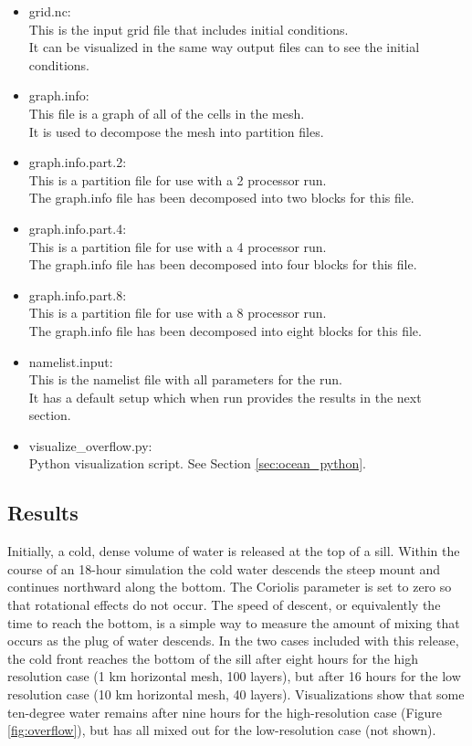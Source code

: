 \begin{itemize}
	\item grid.nc: \\
		This is the input grid file that includes initial conditions.  \\
		It can be visualized in the same way output files can to see the initial conditions.
	\item graph.info: \\
		This file is a graph of all of the cells in the mesh. \\
		It is used to decompose the mesh into partition files.
	\item graph.info.part.2: \\
		This is a partition file for use with a 2 processor run. \\
		The graph.info file has been decomposed into two blocks for this file.
	\item graph.info.part.4: \\
		This is a partition file for use with a 4 processor run. \\
		The graph.info file has been decomposed into four blocks for this file.
	\item graph.info.part.8: \\
		This is a partition file for use with a 8 processor run. \\
		The graph.info file has been decomposed into eight blocks for this file.
	\item namelist.input: \\
		This is the namelist file with all parameters for the run. \\
		It has a default setup which when run provides the results in the next section.
	\item visualize\_overflow.py: \\
		Python visualization script.  See Section \ref{sec:ocean_python}.
\end{itemize}

\subsection{Results}
\label{subsecc:overflow_results}
Initially, a cold, dense volume of water is released at the top of a sill.  Within the course of an 18-hour simulation the cold water descends the steep mount and continues northward along the bottom.  The Coriolis parameter is set to zero so that rotational effects do not occur.  The speed of descent, or equivalently the time to reach the bottom, is a simple way to measure the amount of mixing that occurs as the plug of water descends.  In the two cases included with this release, the cold front reaches the bottom of the sill after eight hours for the high resolution case (1 km horizontal mesh, 100 layers), but after 16 hours for the low resolution case (10 km horizontal mesh, 40 layers).  Visualizations show that some ten-degree water remains after nine hours for the high-resolution case (Figure \ref{fig:overflow}), but has all mixed out for the low-resolution case (not shown).

